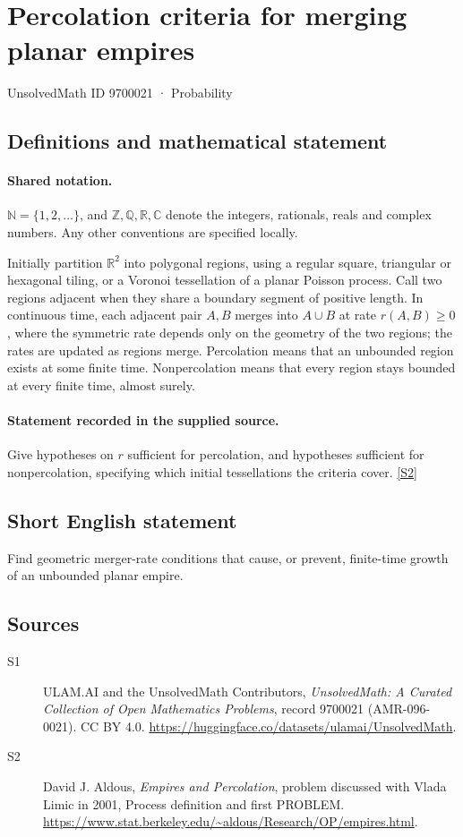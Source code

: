 \documentclass[11pt]{article}
\newcommand{\sref}[2]{\hyperlink{source:#1:#2}{[S#2]}}
\begin{document}
\setcounter{section}{9700020}
\section{Percolation criteria for merging planar empires}\label{9700021}
{\small\sffamily UnsolvedMath ID 9700021 · Probability}
\subsection{Definitions and mathematical statement}

\paragraph{Shared notation.}$\mathbb N=\{1,2,\ldots\}$, and $\mathbb Z,\mathbb Q,\mathbb R,\mathbb C$ denote the integers, rationals, reals and complex numbers. Any other conventions are specified locally.


Initially partition $\mathbb R^2$ into polygonal regions, using a regular square, triangular or hexagonal tiling, or a Voronoi tessellation of a planar Poisson process. Call two regions adjacent when they share a boundary segment of positive length. In continuous time, each adjacent pair $A,B$ merges into $A\cup B$ at rate $r(A,B)\ge0$, where the symmetric rate depends only on the geometry of the two regions; the rates are updated as regions merge. Percolation means that an unbounded region exists at some finite time. Nonpercolation means that every region stays bounded at every finite time, almost surely.
\paragraph{Statement recorded in the supplied source.}
Give hypotheses on $r$ sufficient for percolation, and hypotheses sufficient for nonpercolation, specifying which initial tessellations the criteria cover. \sref{9700021}{2}
\subsection{Short English statement}
Find geometric merger-rate conditions that cause, or prevent, finite-time growth of an unbounded planar empire.
\subsection{Sources}
\begin{description}
\item[\hypertarget{source:9700021:1}{S1}] ULAM.AI and the UnsolvedMath Contributors, \emph{UnsolvedMath: A Curated Collection of Open Mathematics Problems}, record 9700021 (AMR-096-0021). CC BY 4.0. \url{https://huggingface.co/datasets/ulamai/UnsolvedMath}.
\item[\hypertarget{source:9700021:2}{S2}] David J. Aldous, \emph{Empires and Percolation}, problem discussed with Vlada Limic in 2001, Process definition and first PROBLEM. \url{https://www.stat.berkeley.edu/~aldous/Research/OP/empires.html}.
\end{description}
\label{end:9700021}
\end{document}
